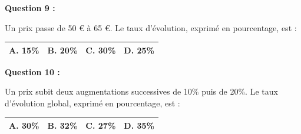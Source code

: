 \documentclass[12pt,a4paper]{article}
\begin{document}
\vspace{0.7cm}

\textbf{Question 9 :}
\vspace{5pt}

Un prix passe de 50 € à 65 €. Le taux d’évolution, exprimé en pourcentage, est :
\vspace{0.3cm}

\renewcommand{\arraystretch}{3}
\begin{tabular}{|m{3.4cm}|m{3.4cm}|m{3.4cm}|m{3.4cm}|}
\hline
\centering \vspace{-0.3cm} \textbf{A.} 15\% & 
\centering \vspace{-0.3cm} \textbf{B.} 20\% & 
\centering \vspace{-0.3cm} \textbf{C.} 30\% & 
\centering \vspace{-0.3cm} \textbf{D.} 25\% \tabularnewline
\hline
\end{tabular}

\vspace{0.7cm}

\textbf{Question 10 :}
\vspace{5pt}

Un prix subit deux augmentations successives de 10\% puis de 20\%. Le taux d’évolution 
global, exprimé en pourcentage, est :
\vspace{0.3cm}

\renewcommand{\arraystretch}{3}
\begin{tabular}{|m{3.4cm}|m{3.4cm}|m{3.4cm}|m{3.4cm}|}
\hline
\centering \vspace{-0.3cm} \textbf{A.} 30\% & 
\centering \vspace{-0.3cm} \textbf{B.} 32\% & 
\centering \vspace{-0.3cm} \textbf{C.} 27\% & 
\centering \vspace{-0.3cm} \textbf{D.} 35\% \tabularnewline
\hline
\end{tabular}
\end{document}

